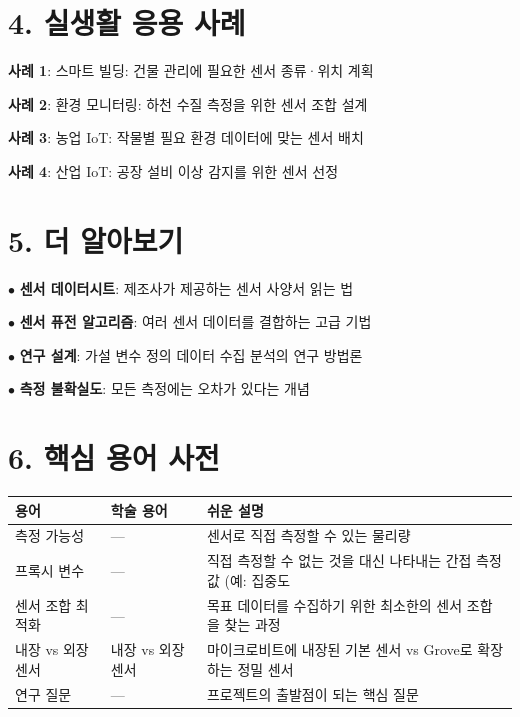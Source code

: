 \documentclass[11pt,a4paper]{article}
\begin{document}
\section*{4. 실생활 응용 사례}

\textbf{사례 1}: 스마트 빌딩: 건물 관리에 필요한 센서 종류·위치 계획


\textbf{사례 2}: 환경 모니터링: 하천 수질 측정을 위한 센서 조합 설계


\textbf{사례 3}: 농업 IoT: 작물별 필요 환경 데이터에 맞는 센서 배치


\textbf{사례 4}: 산업 IoT: 공장 설비 이상 감지를 위한 센서 선정



\section*{5. 더 알아보기}

$\bullet$ \textbf{센서 데이터시트}: 제조사가 제공하는 센서 사양서 읽는 법

$\bullet$ \textbf{센서 퓨전 알고리즘}: 여러 센서 데이터를 결합하는 고급 기법

$\bullet$ \textbf{연구 설계}: 가설 \textrightarrow{} 변수 정의 \textrightarrow{} 데이터 수집 \textrightarrow{} 분석의 연구 방법론

$\bullet$ \textbf{측정 불확실도}: 모든 측정에는 오차가 있다는 개념



\section*{6. 핵심 용어 사전}

\begin{center}
\renewcommand{\arraystretch}{1.4}
\begin{tabular}{|p{2.6cm}|p{2.6cm}|p{9.8cm}|}
\hline
\rowcolor{tableheader}
\textbf{용어} & \textbf{학술 용어} & \textbf{쉬운 설명} \\
\hline
측정 가능성 & — & 센서로 직접 측정할 수 있는 물리량 \\
\hline
프록시 변수 & — & 직접 측정할 수 없는 것을 대신 나타내는 간접 측정값 (예: 집중도 \textrightarrow{} \\
\hline
센서 조합 최적화 & — & 목표 데이터를 수집하기 위한 최소한의 센서 조합을 찾는 과정 \\
\hline
내장 vs 외장 센서 & 내장 vs 외장 센서 & 마이크로비트에 내장된 기본 센서 vs Grove로 확장하는 정밀 센서 \\
\hline
연구 질문 & — & 프로젝트의 출발점이 되는 핵심 질문 \\
\hline
\end{tabular}
\end{center}
\end{document}
